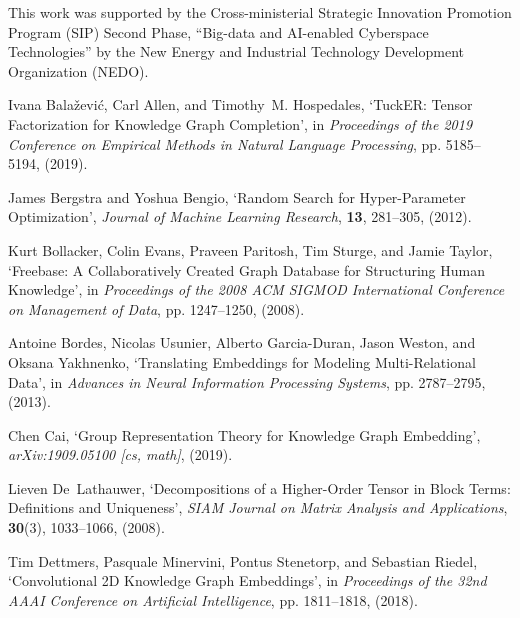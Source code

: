 \documentclass{ecai}
\theoremstyle{plain}  \newtheorem{thm}{Theorem}  \newtheorem{lem}[thm]{Lemma}  \newtheorem{prop}[thm]{Proposition}
\theoremstyle{remark}  \newtheorem*{rem}{Remark}
\begin{document}
\ack
This work was supported by the Cross-ministerial Strategic Innovation Promotion Program (SIP) Second Phase, ``Big-data and AI-enabled Cyberspace Technologies'' by the New Energy and Industrial Technology Development Organization (NEDO).


\begin{thebibliography}{10}

Ivana Bala{\v z}evi{\'c}, Carl Allen, and Timothy~M. Hospedales, `{{TuckER}}:
  {{Tensor Factorization}} for {{Knowledge Graph Completion}}', in {\em
  Proceedings of the 2019 {{Conference}} on {{Empirical Methods}} in {{Natural
  Language Processing}}}, pp. 5185--5194, (2019).

James Bergstra and Yoshua Bengio, `Random {{Search}} for {{Hyper-Parameter
  Optimization}}', {\em Journal of Machine Learning Research}, {\bf 13},
  281--305, (2012).

Kurt Bollacker, Colin Evans, Praveen Paritosh, Tim Sturge, and Jamie Taylor,
  `Freebase: A {{Collaboratively Created Graph Database}} for {{Structuring
  Human Knowledge}}', in {\em Proceedings of the 2008 {{ACM SIGMOD
  International Conference}} on {{Management}} of {{Data}}}, pp. 1247--1250,
  (2008).

Antoine Bordes, Nicolas Usunier, Alberto {Garcia-Duran}, Jason Weston, and
  Oksana Yakhnenko, `Translating {{Embeddings}} for {{Modeling Multi-Relational
  Data}}', in {\em Advances in {{Neural Information Processing Systems}}}, pp.
  2787--2795, (2013).

Chen Cai, `Group {{Representation Theory}} for {{Knowledge Graph Embedding}}',
  {\em arXiv:1909.05100 [cs, math]}, (2019).

Lieven De~Lathauwer, `Decompositions of a {{Higher-Order Tensor}} in {{Block
  Terms}}: {{Definitions}} and {{Uniqueness}}', {\em SIAM
  Journal on Matrix Analysis and Applications}, {\bf 30}(3),  1033--1066,
  (2008).

Tim Dettmers, Pasquale Minervini, Pontus Stenetorp, and Sebastian Riedel,
  `Convolutional {{2D Knowledge Graph Embeddings}}', in {\em Proceedings of the
  32nd {{AAAI Conference}} on {{Artificial Intelligence}}}, pp. 1811--1818,
  (2018).


\end{thebibliography}
\end{document}

